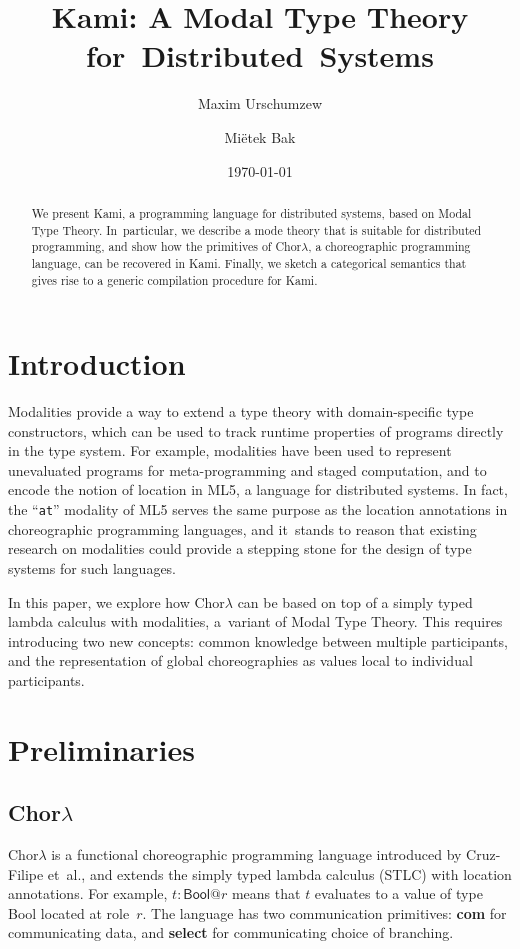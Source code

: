 \documentclass{scrartcl}
\title{Kami: A Modal Type Theory for~Distributed~Systems}
\author{
  Maxim Urschumzew
  \emailhref{mxmurw@determi.io}
  \and
  Miëtek Bak
  \emailhref{mietek@bak.io}
}
\date{\today}
\theoremstyle{definition}
\theoremstyle{plain}
\newcommand{\primitive}[1]{\textsf{\textbf{#1}}}
\begin{document}
\maketitle
\begin{abstract}
  \noindent
  We present Kami, a programming language for distributed systems, based on
  Modal Type Theory. In~particular, we describe a mode theory that is suitable
  for distributed programming, and show how the primitives of Chor$\lambda$, a
  choreographic programming language, can be recovered in Kami. Finally, we
  sketch a categorical semantics that gives rise to a generic compilation
  procedure for Kami.
\end{abstract}



\section{Introduction}
Modalities provide a way to extend a type theory with domain-specific type
constructors, which can be used to track runtime properties of programs
directly in the type system. For example, modalities have been used to
represent unevaluated programs for meta-programming\cite{bak2020self} and
staged computation\cite{davies2001modal}, and to encode the notion of location
in ML5, a language for distributed systems\cite{murphy2008modal}. In fact, the
``\texttt{at}'' modality of ML5 serves the same purpose as the location
annotations in choreographic programming languages\cite{giallorenzo2024choral},
and it~stands to reason that existing research on modalities could provide a
stepping stone for the design of type systems for such languages.

In this paper, we explore how Chor$\lambda$ can be based on top of a simply
typed lambda calculus with modalities, a~variant of Modal Type Theory. This
requires introducing two new concepts: common knowledge between multiple
participants, and the representation of global choreographies as values local
to individual participants.



\section{Preliminaries}
\subsection{\texorpdfstring{Chor$\lambda$}{ChorLambda}}
Chor$\lambda$ is a functional choreographic programming language introduced by
Cruz-Filipe et~al.\cite{cruz2022functional}, and extends the simply typed
lambda calculus (STLC) with location annotations. For example, $t :
\textsf{Bool} @ r$ means that $t$ evaluates to a value of type \textsf{Bool}
located at role~$r$. The language has two communication primitives:
\primitive{com} for communicating data, and \primitive{select} for
communicating choice of branching.
\end{document}
